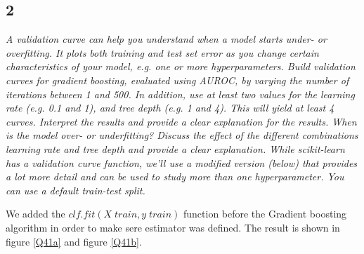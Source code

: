 \documentclass[a4paper,12pt]{article}
\begin{document}
{\subsection*{2}
{\it A validation curve can help you understand when a model starts under- or overfitting. It plots both training and test set error as you change certain characteristics of your model, e.g. one or more hyperparameters. Build validation curves for gradient boosting, evaluated using AUROC, by varying the number of iterations between 1 and 500. In addition, use at least two values for the learning rate (e.g. 0.1 and 1), and tree depth (e.g. 1 and 4). This will yield at least 4 curves. Interpret the results and provide a clear explanation for the results. When is the model over- or underfitting? Discuss the effect of the different combinations learning rate and tree depth and provide a clear explanation.
While scikit-learn has a validation curve function, we'll use a modified version (below) that provides a lot more detail and can be used to study more than one hyperparameter. You can use a default train-test split.}

\textnormal{We added the $clf.fit(X\; train,y\; train)$ function before the Gradient boosting algorithm in order to make sere estimator was defined. The result is shown in figure \ref{Q41a} and figure \ref{Q41b}.}
 
}
\end{document}
